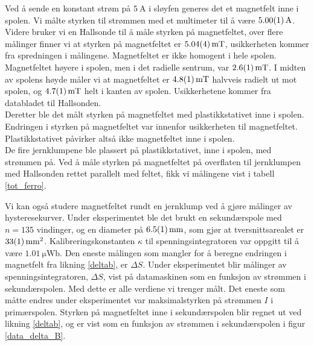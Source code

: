 \documentclass[%
 reprint,
 amsmath,amssymb,
 aps,
 norsk,
]{revtex4-1}
\begin{document}
Ved å sende en konstant strøm på $\SI{5}{\ampere}$ i sløyfen generes det et magnetfelt inne i spolen. Vi målte styrken til strømmen med et multimeter til å være $\SI{5.00\pm0.01}{\ampere}$. Videre bruker vi en Hallsonde til å måle styrken på magnetfeltet, over flere målinger finner vi at styrken på magnetfeltet er $\SI{5.04\pm0.04}{\milli\tesla}$, usikkerheten kommer fra spredningen i målingene. Magnetfeltet er ikke homogent i hele spolen. Magnetfeltet høyere i spolen, men i det radielle sentrum, var $\SI{2.6\pm0.1}{\milli\tesla}$. I midten av spolens høyde måler vi at magnetfeltet er $\SI{4.8\pm0.1}{\milli\tesla}$ halvveis radielt ut mot spolen, og $\SI{4.7\pm0.1}{\milli\tesla}$ helt i kanten av spolen. Usikkerhetene kommer fra databladet til Hallsonden.\\
Deretter ble det målt styrken på magnetfeltet med plastikkstativet inne i spolen. Endringen i styrken på magnetfeltet var innenfor usikkerheten til magnetfeltet. Plastikkstativet påvirker altså ikke magnetfeltet inne i spolen. \\
De fire jernklumpene ble plassert på plastikkstativet, inne i spolen, med strømmen på. Ved å måle styrken på magnetfeltet på overflaten til jernklumpen med Hallsonden rettet parallelt med feltet, fikk vi målingene vist i tabell \vref{tot_ferro}.\par
Vi kan også studere magnetfeltet rundt en jernklump ved å gjøre målinger av hysteresekurver. Under eksperimentet ble det brukt en sekundærspole med $n=135$ vindinger, og en diameter på $\SI{6.5\pm0.1}{\milli\meter}$, som gjør at tversnittsarealet er $\SI{33\pm1}{\milli\meter^2}$. Kalibreringskonstanten $\kappa$ til spenningsintegratoren var oppgitt til å være $\SI{1.01}{\micro\weber}$. Den eneste målingen som mangler for å beregne endringen i magnetfelt fra likning \eqref{deltab}, er $\Delta S$.
Under eksperimentet blir målinger av spenningsintegratoren, $\Delta S$, vist på datamaskinen som en funksjon av strømmen i sekundærspolen. Med dette er alle verdiene vi trenger målt. Det eneste som måtte endres under eksperimentet var maksimalstyrken på strømmen $I$ i primærspolen. Styrken på magnetfeltet inne i sekundærspolen blir regnet ut ved likning \eqref{deltab}, og er vist som en funksjon av strømmen i sekundærspolen i figur \vref{data_delta_B}.
\end{document}
